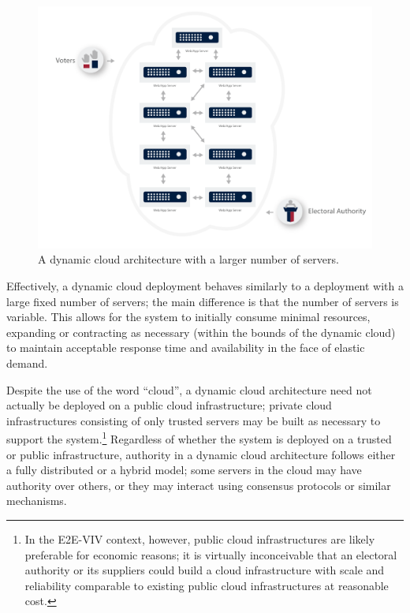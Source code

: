 \begin{figure}
\begin{center}
\includegraphics[width=6.5in]{architecture_resources/dynamic-cloud-large.pdf}
\end{center}
\vspace*{-2ex}
\caption{A dynamic cloud architecture with a larger number of servers.}
\label{figure:arch-dynamic-cloud-large}
\end{figure}

Effectively, a dynamic cloud deployment behaves similarly to a
deployment with a large fixed number of servers; the main difference
is that the number of servers is variable. This allows for the system
to initially consume minimal resources, expanding or contracting as
necessary (within the bounds of the dynamic cloud) to maintain
acceptable response time and availability in the face of elastic
demand.

Despite the use of the word ``cloud'', a dynamic cloud architecture
need not actually be deployed on a public cloud infrastructure;
private cloud infrastructures consisting of only trusted servers may
be built as necessary to support the system.\footnote{In the E2E-VIV
  context, however, public cloud infrastructures are likely preferable
  for economic reasons; it is virtually inconceivable that an
  electoral authority or its suppliers could build a cloud
  infrastructure with scale and reliability comparable to existing
  public cloud infrastructures at reasonable cost.}  Regardless of
whether the system is deployed on a trusted or public infrastructure,
authority in a dynamic cloud architecture follows either a fully
distributed or a hybrid model; some servers in the cloud may have
authority over others, or they may interact using consensus protocols
or similar mechanisms.

